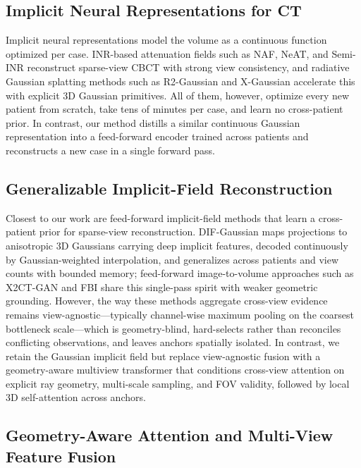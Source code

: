 \subsection{Implicit Neural Representations for CT}
\label{sec:related:inr}

Implicit neural representations model the volume as a continuous function
optimized per case. INR-based attenuation fields such as NAF, NeAT, and
Semi-INR \cite{zang2021naf,cai2023neat,cai2024semiinr} reconstruct sparse-view
CBCT with strong view consistency, and radiative Gaussian splatting methods
such as R2-Gaussian and X-Gaussian \cite{zhang2024r2gaussian,cai2024xgaussian}
accelerate this with explicit 3D Gaussian primitives. All of them, however,
optimize every new patient from scratch, take tens of minutes per case, and
learn no cross-patient prior. In contrast, our method distills a similar
continuous Gaussian representation into a feed-forward encoder trained across
patients and reconstructs a new case in a single forward pass.

\subsection{Generalizable Implicit-Field Reconstruction}
\label{sec:related:generalizable}

Closest to our work are feed-forward implicit-field methods that learn a
cross-patient prior for sparse-view reconstruction. DIF-Gaussian
\cite{lin2024dif} maps projections to anisotropic 3D Gaussians carrying deep
implicit features, decoded continuously by Gaussian-weighted interpolation,
and generalizes across patients and view counts with bounded memory;
feed-forward image-to-volume approaches such as X2CT-GAN and FBI
\cite{ying2019x2ct,qiu2023fbi} share this single-pass spirit with weaker
geometric grounding. However, the way these methods aggregate cross-view
evidence remains view-agnostic---typically channel-wise maximum pooling on the
coarsest bottleneck scale---which is geometry-blind, hard-selects rather than
reconciles conflicting observations, and leaves anchors spatially isolated. In
contrast, we retain the Gaussian implicit field but replace view-agnostic
fusion with a geometry-aware multiview transformer that conditions cross-view
attention on explicit ray geometry, multi-scale sampling, and FOV validity,
followed by local 3D self-attention across anchors.

\subsection{Geometry-Aware Attention and Multi-View Feature Fusion}
\label{sec:related:attention}

